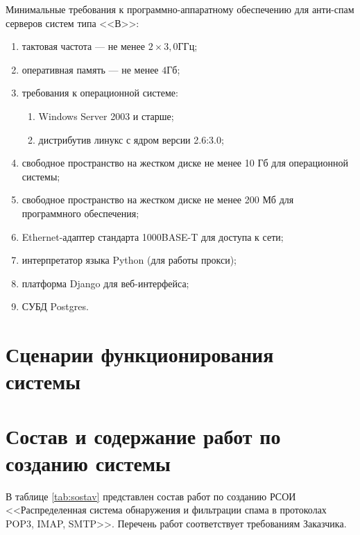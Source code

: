Минимальные требования к программно-аппаратному обеспечению для анти-спам серверов систем типа <<В>>:

\begin{enumerate}
	\item тактовая частота  --- не менее $2\times3,0 \text{ГГц}$; 
	\item оперативная память --- не менее $4 \text{Гб}$;
	\item требования к операционной системе:
	\begin{enumerate}
		\item Windows Server 2003 и старше;
		\item дистрибутив линукс с ядром версии 2.6:3.0;
	\end{enumerate}
	\item свободное пространство на жестком диске не менее 10 Гб для операционной системы;
	\item свободное пространство на жестком диске не менее 200 Мб для программного обеспечения;
	\item Ethernet-адаптер стандарта 1000BASE-T для доступа к сети;
	\item интерпретатор языка Python (для работы прокси);
	\item платформа Django для веб-интерфейса;
	\item СУБД Postgres.
\end{enumerate}

\section{Сценарии функционирования системы}


\section{Состав и содержание работ по созданию системы}
В таблице \ref{tab:sostav} представлен состав работ по созданию РСОИ <<Распределенная система обнаружения и фильтрации спама в протоколах POP3, IMAP, SMTP>>. Перечень работ соответствует требованиям Заказчика.

